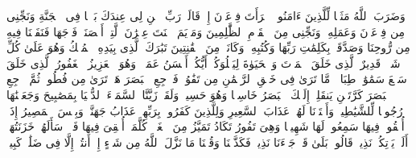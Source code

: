 وَضَرَبَ ٱللَّهُ مَثَلࣰا لِّلَّذِینَ ءَامَنُوا۟ ٱمۡرَأَتَ فِرۡعَوۡنَ إِذۡ قَالَتۡ رَبِّ ٱبۡنِ لِی عِندَكَ بَیۡتࣰا فِی ٱلۡجَنَّةِ وَنَجِّنِی مِن فِرۡعَوۡنَ وَعَمَلِهِۦ وَنَجِّنِی مِنَ ٱلۡقَوۡمِ ٱلظَّٰلِمِینَ%
\stopbuffer%
\startbuffer[\q:66:12]
وَمَرۡیَمَ ٱبۡنَتَ عِمۡرَٰنَ ٱلَّتِیۤ أَحۡصَنَتۡ فَرۡجَهَا فَنَفَخۡنَا فِیهِ مِن رُّوحِنَا وَصَدَّقَتۡ بِكَلِمَٰتِ رَبِّهَا وَكُتُبِهِۦ وَكَانَتۡ مِنَ ٱلۡقَٰنِتِینَ%
\stopbuffer%
\startbuffer[\q:67:1]
تَبَٰرَكَ ٱلَّذِی بِیَدِهِ ٱلۡمُلۡكُ وَهُوَ عَلَىٰ كُلِّ شَیۡءࣲ قَدِیرٌ%
\stopbuffer%
\startbuffer[\q:67:2]
ٱلَّذِی خَلَقَ ٱلۡمَوۡتَ وَٱلۡحَیَوٰةَ لِیَبۡلُوَكُمۡ أَیُّكُمۡ أَحۡسَنُ عَمَلࣰاۚ وَهُوَ ٱلۡعَزِیزُ ٱلۡغَفُورُ%
\stopbuffer%
\startbuffer[\q:67:3]
ٱلَّذِی خَلَقَ سَبۡعَ سَمَٰوَٰتࣲ طِبَاقࣰاۖ مَّا تَرَىٰ فِی خَلۡقِ ٱلرَّحۡمَٰنِ مِن تَفَٰوُتࣲۖ فَٱرۡجِعِ ٱلۡبَصَرَ هَلۡ تَرَىٰ مِن فُطُورࣲ%
\stopbuffer%
\startbuffer[\q:67:4]
ثُمَّ ٱرۡجِعِ ٱلۡبَصَرَ كَرَّتَیۡنِ یَنقَلِبۡ إِلَیۡكَ ٱلۡبَصَرُ خَاسِئࣰا وَهُوَ حَسِیرࣱ%
\stopbuffer%
\startbuffer[\q:67:5]
وَلَقَدۡ زَیَّنَّا ٱلسَّمَاۤءَ ٱلدُّنۡیَا بِمَصَٰبِیحَ وَجَعَلۡنَٰهَا رُجُومࣰا لِّلشَّیَٰطِینِۖ وَأَعۡتَدۡنَا لَهُمۡ عَذَابَ ٱلسَّعِیرِ%
\stopbuffer%
\startbuffer[\q:67:6]
وَلِلَّذِینَ كَفَرُوا۟ بِرَبِّهِمۡ عَذَابُ جَهَنَّمَۖ وَبِئۡسَ ٱلۡمَصِیرُ%
\stopbuffer%
\startbuffer[\q:67:7]
إِذَاۤ أُلۡقُوا۟ فِیهَا سَمِعُوا۟ لَهَا شَهِیقࣰا وَهِیَ تَفُورُ%
\stopbuffer%
\startbuffer[\q:67:8]
تَكَادُ تَمَیَّزُ مِنَ ٱلۡغَیۡظِۖ كُلَّمَاۤ أُلۡقِیَ فِیهَا فَوۡجࣱ سَأَلَهُمۡ خَزَنَتُهَاۤ أَلَمۡ یَأۡتِكُمۡ نَذِیرࣱ%
\stopbuffer%
\startbuffer[\q:67:9]
قَالُوا۟ بَلَىٰ قَدۡ جَاۤءَنَا نَذِیرࣱ فَكَذَّبۡنَا وَقُلۡنَا مَا نَزَّلَ ٱللَّهُ مِن شَیۡءٍ إِنۡ أَنتُمۡ إِلَّا فِی ضَلَٰلࣲ كَبِیرࣲ%
\stopbuffer%
